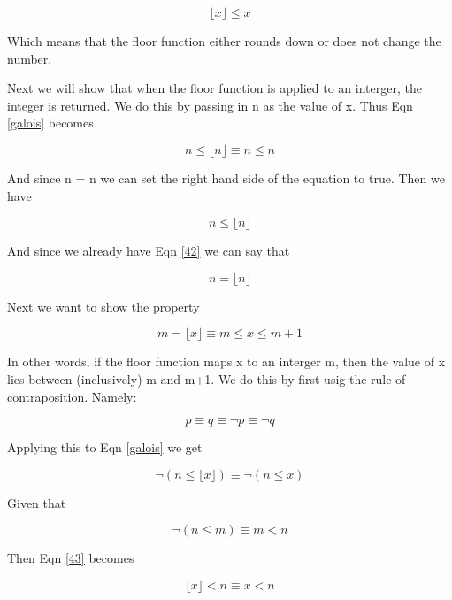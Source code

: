 \documentclass[10pt,a4paper]{article}
\providecommand{\floor}[1]{\lfloor #1 \rfloor  }
\begin{document}
\begin{equation}
\floor{x} \le x
\label{42}
\end{equation}

Which means that the floor function either rounds down or does not change the number.

Next we will show that when the floor function is applied to an interger, the integer is returned. We do this by passing in n as the value of x. Thus Eqn \ref{galois} becomes

\begin{equation}
n \le \floor{n} \equiv n \le n
\end{equation}

And since n = n we can set the right hand side of the equation to true. Then we have  

\begin{equation}
n \le \floor{n}
\end{equation}

And since we already have Eqn \ref{42} we can say that

\begin{equation}
n = \floor{n}
\end{equation}


Next we want to show the property

\begin{equation}
 m = \floor{x} \equiv m \le x \le m+1
 \label{45}
\end{equation}

In other words, if the floor function maps x to an interger m, then the value of x lies between (inclusively) m and m+1. We do this by first usig the rule of contraposition. Namely:

\begin{equation}
 p\equiv q \equiv \neg p \equiv \neg q
\end{equation}

Applying this to Eqn \ref{galois} we get

\begin{equation}
\neg(n \le \floor{x}) \equiv \neg(n \le x)
\label{43}
\end{equation}

Given that 

\begin{equation}
 \neg(n\le m) \equiv m < n
\end{equation}

Then Eqn \ref{43} becomes

\begin{equation}
 \floor{x} < n \equiv x < n
 \label{44}
\end{equation}
\end{document}
